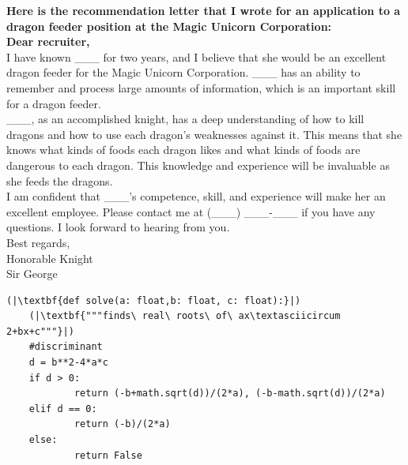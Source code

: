 \documentclass[11pt]{article}
\begin{document}
\begin{framed}
\centering
\vspace{.5em}
 \begin{minipage}{.9\textwidth}
\textbf{Here is the recommendation letter that I wrote for an application to a dragon feeder position at the Magic Unicorn Corporation:\\
Dear recruiter,}\\
I have known \_\_\_ for two years, and I believe that she would be an excellent dragon feeder for the Magic Unicorn Corporation. \_\_\_ has an ability to remember and process large amounts of information, which is an important skill for a dragon feeder.\\
\_\_\_, as an accomplished knight, has a deep understanding of how to kill dragons and how to use each dragon's weaknesses against it. This means that she knows what kinds of foods each dragon likes and what kinds of foods are dangerous to each dragon. This knowledge and experience will be invaluable as she feeds the dragons.\\
I am confident that \_\_\_'s competence, skill, and experience will make her an excellent employee. Please contact me at (\_\_\_) \_\_\_-\_\_\_ if you have any questions. I look forward to hearing from you.\\
Best regards,\\
Honorable Knight\\
Sir George
\end{minipage}
\vspace{.5em}
\end{framed}



\begin{framed}
\centering
\vspace{.5em}
 \begin{minipage}{.9\textwidth}
\begin{lstlisting}
(|\textbf{def solve(a: float,b: float, c: float):}|)
    (|\textbf{"""finds\ real\ roots\ of\ ax\textasciicircum 2+bx+c"""}|)
    #discriminant
    d = b**2-4*a*c
    if d > 0:
            return (-b+math.sqrt(d))/(2*a), (-b-math.sqrt(d))/(2*a)
    elif d == 0:
            return (-b)/(2*a)
    else:
            return False
\end{lstlisting}
\end{minipage}
\vspace{.5em}
\end{framed}
%
%
\end{document}
